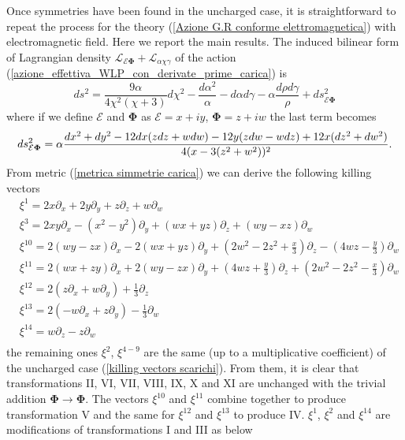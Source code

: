 Once symmetries have been found in the uncharged case, it is straightforward to repeat the process for the theory (\ref{Azione G.R conforme elettromagnetica}) with electromagnetic field. Here we report the main results. The induced bilinear form of Lagrangian density $\mathcal{L}_{\mathcal{E}\boldsymbol{\Phi}}+\mathcal{L}_{\alpha\chi\gamma}$ of the action (\ref{azione_effettiva_WLP_con_derivate_prime_carica}) is 
\begin{equation}
        ds^2 = \frac{9 \alpha}{4\chi^2(\chi +3)}d\chi^2 - \frac{d\alpha^2}{\alpha} -d\alpha d\gamma -\alpha\frac{d\rho d\gamma}{\rho} +ds_{\mathcal{E}\boldsymbol{\Phi}}^2
        \label{metrica simmetrie carica}
\end{equation}
where if we define $\mathcal{E}$ and $\boldsymbol{\Phi}$ as $\mathcal{E} = x+iy$, $\boldsymbol{\Phi} = z+iw$ the last term becomes   
\begin{equation}
    ds_{\mathcal{E}\boldsymbol{\Phi}}^2 = \alpha\frac{dx^2+dy^2-12dx(zdz+wdw)-12y(zdw-wdz)+12x(dz^2+dw^2)}{4(x-3(z^2+w^2))^2}. \notag
\end{equation}
From metric (\ref{metrica simmetrie carica}) we can derive the following killing vectors 
\begin{equation}
    \begin{aligned}
        &\xi^{1} = 2x\partial_x + 2y\partial_y + z\partial_z + w\partial_w \\
        &\xi^{3} = 2xy\partial_x -(x^2-y^2)\partial_y + (wx+yz)\partial_z + (wy-xz)\partial_w \\
        &\xi^{10} = 2(wy-zx)\partial_x - 2(wx+yz)\partial_y + (2w^2-2z^2+\frac{x}{3})\partial_z - (4wz-\frac{y}{3})\partial_w \\
        &\xi^{11} = 2(wx+zy)\partial_x + 2(wy-zx)\partial_y + (4wz+\frac{y}{3})\partial_z + (2w^2-2z^2-\frac{x}{3})\partial_w \\
        &\xi^{12} = 2(z\partial_x + w\partial_y)+\frac{1}{3}\partial_z \\
        &\xi^{13} = 2(-w\partial_x + z\partial_y)-\frac{1}{3}\partial_w \\
        &\xi^{14} = w\partial_z -z\partial_w \\
    \end{aligned}
\end{equation}
the remaining ones $\xi^{2}$, $\xi^{4-9}$ are the same (up to a multiplicative coefficient) of the uncharged case (\ref{killing vectors scarichi}). From them, it is clear that transformations II, VI, VII, VIII, IX, X and XI are unchanged with the trivial addition  $\boldsymbol{\Phi}\rightarrow\boldsymbol{\Phi}$. The vectors $\xi^{10}$ and $\xi^{11}$ combine together to produce transformation V and the same for $\xi^{12}$ and $\xi^{13}$ to produce IV. $\xi^1$, $\xi^2$ and $\xi^{14}$ are modifications of transformations I and III as below 
